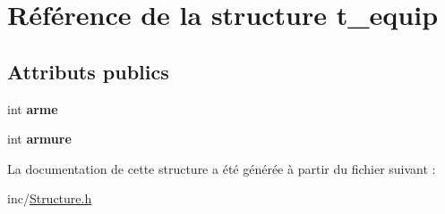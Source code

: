 \hypertarget{structt__equip}{}\section{Référence de la structure t\+\_\+equip}
\label{structt__equip}
\subsection*{Attributs publics}
\begin{DoxyCompactItemize}
\item 
\hypertarget{structt__equip_a051b059745d98cf1dbfbdc879bbd69c1}{}int {\bfseries arme}\label{structt__equip_a051b059745d98cf1dbfbdc879bbd69c1}

\item 
\hypertarget{structt__equip_a25386c2252dc8b1a4dcb7afa1428b2a2}{}int {\bfseries armure}\label{structt__equip_a25386c2252dc8b1a4dcb7afa1428b2a2}

\end{DoxyCompactItemize}


La documentation de cette structure a été générée à partir du fichier suivant \+:\begin{DoxyCompactItemize}
\item 
inc/\hyperlink{Structure_8h}{Structure.\+h}\end{DoxyCompactItemize}
